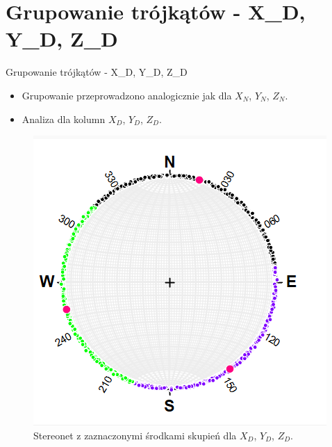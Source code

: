 \documentclass{beamer}
\begin{document}
\section{Grupowanie trójkątów - X\_D, Y\_D, Z\_D}
\begin{frame}{Grupowanie trójkątów - X\_D, Y\_D, Z\_D}
    \begin{itemize}
        \item Grupowanie przeprowadzono analogicznie jak dla $X_N$, $Y_N$, $Z_N$.
        \item Analiza dla kolumn $X_D$, $Y_D$, $Z_D$.
    \end{itemize}
    \begin{figure}
        \includegraphics[scale=0.5]{X_D.png}
        \caption{Stereonet z zaznaczonymi środkami skupień dla $X_D$, $Y_D$, $Z_D$.}
    \end{figure}
\end{frame}





\end{document}
